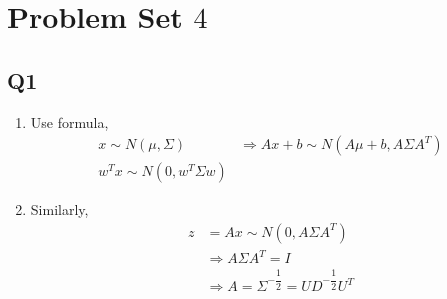 \documentclass{article}
\begin{document}
\section{Problem Set $4$} 


\subsection{Q1}
\begin{enumerate}
\item Use formula,
\begin{align*}
x  \sim  N\left(\mu, \Sigma\right) &\Rightarrow  A x + b \sim  N\left(A \mu + b, A \Sigma A^{T}\right)
\\ w^{T} x \sim  N\left(0, w^{T} \Sigma w \right) & 
\end{align*}
\item Similarly,
\begin{align*}
z  &= A x \sim  N\left(0, A \Sigma A^{T}\right)
\\ &\Rightarrow  A \Sigma A^{T} = I 
\\ &\Rightarrow  A = \Sigma^{- \dfrac{1}{2}} = U D^{- \dfrac{1}{2}} U^{T}
\end{align*}
\end{enumerate}
\end{document}
